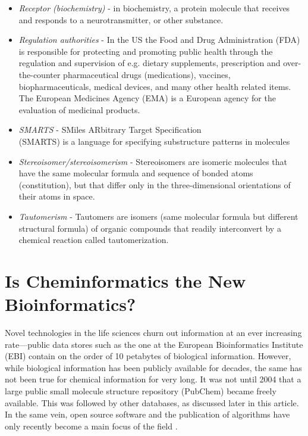 \documentclass{sig-alternate}
\begin{document}
{\begin{itemize}
\item \textit{Receptor (biochemistry)} - in biochemistry, a protein molecule that receives and responds to a neurotransmitter, or other substance.
\item \textit{Regulation authorities} - In the US the Food and Drug Administration (FDA) is responsible for protecting and promoting public health through the regulation and supervision of e.g. dietary supplements, prescription and over-the-counter pharmaceutical drugs (medications), vaccines, biopharmaceuticals, medical devices, and many other health related items. The European Medicines Agency (EMA) is a European agency for the evaluation of medicinal products.
\item \textit{SMARTS} - SMiles ARbitrary Target Specification \\(SMARTS) is a language for specifying substructure patterns in molecules
\item \textit{Stereoisomer/stereoisomerism} - Stereoisomers are isomeric molecules that have the same molecular formula and sequence of bonded atoms (constitution), but that differ only in the three-dimensional orientations of their atoms in space.
\item \textit{Tautomerism} - Tautomers are isomers (same molecular formula but different structural formula) of organic compounds that readily interconvert by a chemical reaction called tautomerization.
\end{itemize}
}

\section{Is Cheminformatics the New \\Bioinformatics?}

Novel technologies in the life sciences churn out information at an ever
increasing rate---public data stores such as the one at the European Bioinformatics
Institute (EBI) contain on the order of 10 petabytes of biological information.
However, while biological information has been publicly available for decades,
the same has not been true for chemical information for very long. It was
not until 2004 that a large public small molecule structure repository (PubChem)
became freely available. This was followed by other databases, as discussed later
in this article. In the same vein, open source software and the publication of
algorithms have only recently become a main focus of the field
\cite{faulon2010}.
\end{document}
